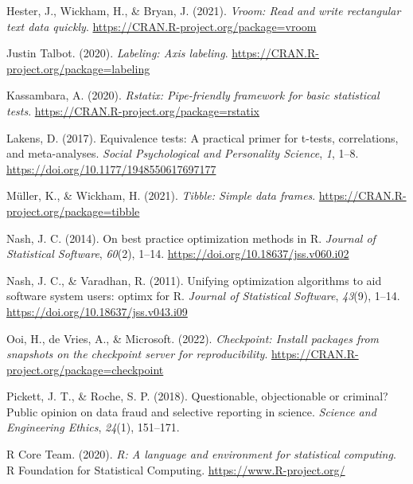 \documentclass[
  man,floatsintext]{apa7}
\newlength{\cslhangindent}
\newlength{\cslentryspacingunit} %
\newenvironment{CSLReferences}[2] %
 {%
  \setlength{\parindent}{0pt}
  \ifodd #1
  \let\oldpar\par
  \def\par{\hangindent=\cslhangindent\oldpar}
  \fi
  \setlength{\parskip}{#2\cslentryspacingunit}
 }%
 {}
\begin{document}
\begin{CSLReferences}{1}{0}
\leavevmode{}%
Hester, J., Wickham, H., \& Bryan, J. (2021). \emph{Vroom: Read and write rectangular text data quickly}. \url{https://CRAN.R-project.org/package=vroom}

\leavevmode{}%
Justin Talbot. (2020). \emph{Labeling: Axis labeling}. \url{https://CRAN.R-project.org/package=labeling}

\leavevmode{}%
Kassambara, A. (2020). \emph{Rstatix: Pipe-friendly framework for basic statistical tests}. \url{https://CRAN.R-project.org/package=rstatix}

\leavevmode{}%
Lakens, D. (2017). Equivalence tests: A practical primer for t-tests, correlations, and meta-analyses. \emph{Social Psychological and Personality Science}, \emph{1}, 1--8. \url{https://doi.org/10.1177/1948550617697177}

\leavevmode{}%
Müller, K., \& Wickham, H. (2021). \emph{Tibble: Simple data frames}. \url{https://CRAN.R-project.org/package=tibble}

\leavevmode{}%
Nash, J. C. (2014). On best practice optimization methods in {R}. \emph{Journal of Statistical Software}, \emph{60}(2), 1--14. \url{https://doi.org/10.18637/jss.v060.i02}

\leavevmode{}%
Nash, J. C., \& Varadhan, R. (2011). Unifying optimization algorithms to aid software system users: {optimx} for {R}. \emph{Journal of Statistical Software}, \emph{43}(9), 1--14. \url{https://doi.org/10.18637/jss.v043.i09}

\leavevmode{}%
Ooi, H., de Vries, A., \& Microsoft. (2022). \emph{Checkpoint: Install packages from snapshots on the checkpoint server for reproducibility}. \url{https://CRAN.R-project.org/package=checkpoint}

\leavevmode{}%
Pickett, J. T., \& Roche, S. P. (2018). Questionable, objectionable or criminal? Public opinion on data fraud and selective reporting in science. \emph{Science and Engineering Ethics}, \emph{24}(1), 151--171.

\leavevmode{}%
R Core Team. (2020). \emph{R: A language and environment for statistical computing}. R Foundation for Statistical Computing. \url{https://www.R-project.org/}


\end{CSLReferences}
\end{document}
